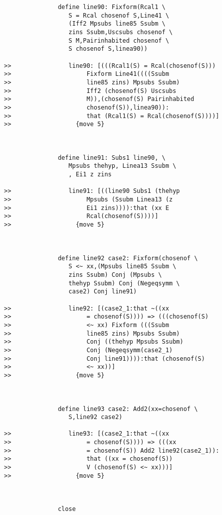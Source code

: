 \documentclass[12pt]{article}
\begin{document}
\begin{verbatim}
               define line90: Fixform(Rcal1 \
                  S = Rcal chosenof S,Line41 \
                  (Iff2 Mpsubs line85 Ssubm \
                  zins Ssubm,Uscsubs chosenof \
                  S M,Pairinhabited chosenof \
                  S chosenof S,linea90))

>>                line90: [(((Rcal1(S) = Rcal(chosenof(S)))
>>                     Fixform Line41((((Ssubm
>>                     line85 zins) Mpsubs Ssubm)
>>                     Iff2 (chosenof(S) Uscsubs
>>                     M)),(chosenof(S) Pairinhabited
>>                     chosenof(S)),linea90)):
>>                     that (Rcal1(S) = Rcal(chosenof(S))))]
>>                  {move 5}



               define line91: Subs1 line90, \
                  Mpsubs thehyp, Linea13 Ssubm \
                  , Ei1 z zins

>>                line91: [((line90 Subs1 (thehyp
>>                     Mpsubs (Ssubm Linea13 (z
>>                     Ei1 zins)))):that (xx E
>>                     Rcal(chosenof(S))))]
>>                  {move 5}



               define line92 case2: Fixform(chosenof \
                  S <~ xx,(Mpsubs line85 Ssubm \
                  zins Ssubm) Conj (Mpsubs \
                  thehyp Ssubm) Conj (Negeqsymm \
                  case2) Conj line91)

>>                line92: [(case2_1:that ~((xx
>>                     = chosenof(S)))) => (((chosenof(S)
>>                     <~ xx) Fixform (((Ssubm
>>                     line85 zins) Mpsubs Ssubm)
>>                     Conj ((thehyp Mpsubs Ssubm)
>>                     Conj (Negeqsymm(case2_1)
>>                     Conj line91)))):that (chosenof(S)
>>                     <~ xx))]
>>                  {move 5}



               define line93 case2: Add2(xx=chosenof \
                  S,line92 case2)

>>                line93: [(case2_1:that ~((xx
>>                     = chosenof(S)))) => (((xx
>>                     = chosenof(S)) Add2 line92(case2_1)):
>>                     that ((xx = chosenof(S))
>>                     V (chosenof(S) <~ xx)))]
>>                  {move 5}



               close


\end{verbatim}
\end{document}
